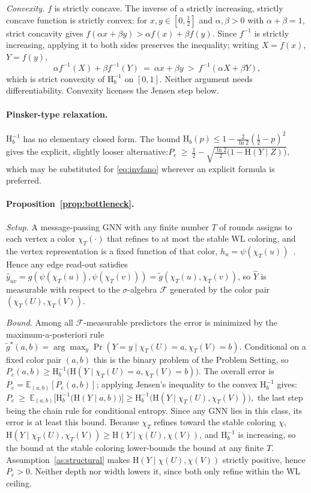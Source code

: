 \documentclass[sigconf, review, anonymous]{acmart}
\newcommand{\Hh}{\mathrm{H}}
\theoremstyle{plain}
\theoremstyle{definition}
\begin{document}
\emph{Convexity.} $f$ is strictly concave. The inverse of a strictly increasing, strictly concave function is strictly convex: for $x,y\in[0,\tfrac12]$ and $\alpha,\beta>0$ with $\alpha+\beta=1$, strict concavity gives $f(\alpha x+\beta y) > \alpha f(x)+\beta f(y)$. Since $f^{-1}$ is strictly increasing, applying it to both sides preserves the inequality; writing $X=f(x)$, $Y=f(y)$,
\[
\alpha f^{-1}(X)+\beta f^{-1}(Y) \ =\ \alpha x+\beta y \ >\ f^{-1}(\alpha X+\beta Y),
\]
which is strict convexity of $\Hh_b^{-1}$ on $[0,1]$. Neither argument needs differentiability. Convexity licenses the Jensen step below.

\paragraph{Pinsker-type relaxation.} $\Hh_b^{-1}$ has no elementary closed form. The bound $\Hh_b(p)\le 1-\tfrac{2}{\ln 2}(\tfrac12-p)^2$~\citep{yeung2008information} gives the explicit, slightly looser alternative:$
P_e\ \ge\ \tfrac12-\sqrt{\tfrac{\ln 2}{2}\big(1-\Hh(Y\mid Z)\big)},$ which may be substituted for \eqref{eq:invfano} wherever an explicit formula is preferred.

\paragraph{Proposition~\ref{prop:bottleneck}.}
\emph{Setup.} A message-passing GNN with any finite number $T$ of rounds assigns to each vertex a color $\chi_T(\cdot)$ that refines to at most the stable WL coloring, and the vertex representation is a fixed function of that color, $h_u=\psi(\chi_T(u))$~\citep{xu2019powerful,morris2019weisfeiler}. Hence any edge read-out satisfies $\hat y_{uv}=g(\psi(\chi_T(u)),\psi(\chi_T(v)))=\tilde g(\chi_T(u),\chi_T(v))$, so $\hat Y$ is measurable with respect to the $\sigma$-algebra $\mathcal{F}$ generated by the color pair $(\chi_T(U),\chi_T(V))$.

\emph{Bound.} Among all $\mathcal{F}$-measurable predictors the error is minimized by the maximum-a-posteriori rule $\tilde g^\star(a,b)=\arg\max_y \Pr(Y=y\mid \chi_T(U)=a,\chi_T(V)=b)$. Conditional on a fixed color pair $(a,b)$ this is the binary problem of the Problem Setting, so $P_e(a,b)\ge \Hh_b^{-1}\big(\Hh(Y\mid \chi_T(U)=a,\chi_T(V)=b)\big)$. The overall error is $P_e=\mathbb{E}_{(a,b)}[P_e(a,b)]$; applying Jensen's inequality to the convex $\Hh_b^{-1}$ gives:$
P_e \ \ge\ \mathbb{E}_{(a,b)}\Big[\Hh_b^{-1}\big(\Hh(Y\mid a,b)\big)\Big]  \ge 
 \Hh_b^{-1}\big(\Hh(Y\mid \chi_T(U),\chi_T(V))\big),
$
the last step being the chain rule for conditional entropy. Since any GNN lies in this class, its error is at least this bound. Because $\chi_T$ refines toward the stable coloring $\chi$, $\Hh(Y\mid \chi_T(U),\chi_T(V))\ge \Hh(Y\mid \chi(U),\chi(V))$, and $\Hh_b^{-1}$ is increasing, so the bound at the stable coloring lower-bounds the bound at any finite $T$. Assumption~\ref{as:structural} makes $\Hh(Y\mid \chi(U),\chi(V))$ strictly positive, hence $P_e>0$. Neither depth nor width lowers it, since both only refine within the WL ceiling.
\end{document}
